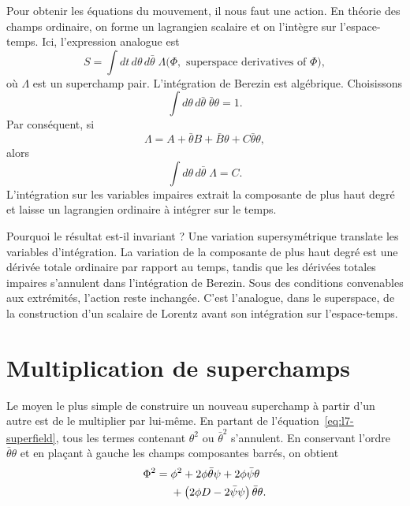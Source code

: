 Pour obtenir les équations du mouvement, il nous faut une action. En théorie des champs ordinaire, on forme un lagrangien scalaire et on l’intègre sur l’espace-temps. Ici, l’expression analogue est
\begin{equation}
S=\int dt\,d\theta\,d\bar\theta\;\Lambda
\bigl(\Phi,\text{ superspace derivatives of }\Phi\bigr),
\label{eq:l7-superaction}
\end{equation}
où \(\Lambda\) est un superchamp pair. L’intégration de Berezin est algébrique. Choisissons
\begin{equation}
\int d\theta\,d\bar\theta\;\bar\theta\theta=1.
\end{equation}
Par conséquent, si
\begin{equation}
\Lambda=A+\bar\theta B+\bar B\theta+C\bar\theta\theta,
\end{equation}
alors
\begin{equation}
\int d\theta\,d\bar\theta\;\Lambda=C.
\label{eq:l7-top-component}
\end{equation}
L’intégration sur les variables impaires extrait la composante de plus haut degré et laisse un lagrangien ordinaire à intégrer sur le temps.

Pourquoi le résultat est-il invariant ? Une variation supersymétrique translate les variables d’intégration. La variation de la composante de plus haut degré est une dérivée totale ordinaire par rapport au temps, tandis que les dérivées totales impaires s’annulent dans l’intégration de Berezin. Sous des conditions convenables aux extrémités, l’action reste inchangée. C’est l’analogue, dans le superspace, de la construction d’un scalaire de Lorentz avant son intégration sur l’espace-temps.

\section{Multiplication de superchamps}

Le moyen le plus simple de construire un nouveau superchamp à partir d’un autre est de le multiplier par lui-même. En partant de l’équation~\eqref{eq:l7-superfield}, tous les termes contenant \(\theta^2\) ou \(\bar\theta^2\) s’annulent. En conservant l’ordre \(\bar\theta\theta\) et en plaçant à gauche les champs composantes barrés, on obtient
\begin{align}
\Phi^2
={}&\phi^2
+2\phi\bar\theta\psi
+2\phi\bar\psi\theta\notag\\
&+\left(2\phi D-2\bar\psi\psi\right)\bar\theta\theta.
\label{eq:l7-superfield-square}
\end{align}

